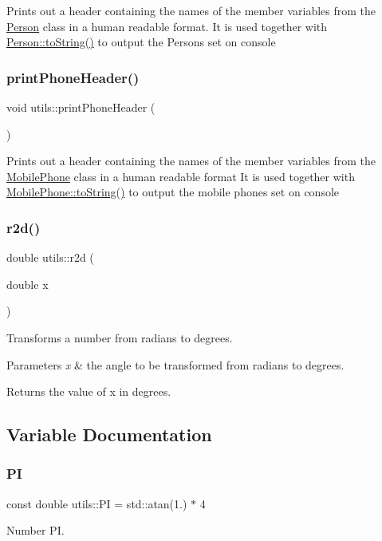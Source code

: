 Prints out a header containing the names of the member variables from the \mbox{\hyperlink{class_person}{Person}} class in a human readable format. It is used together with \mbox{\hyperlink{class_person_a68872538da519d0a04297f43376db27c}{Person\+::to\+String()}} to output the Persons set on console \mbox{\label{namespaceutils_a7633a4dfe509a009f4e02850b03ba1e4}} 
\subsubsection{\texorpdfstring{printPhoneHeader()}{printPhoneHeader()}}
{\footnotesize\ttfamily void utils\+::print\+Phone\+Header (\begin{DoxyParamCaption}{ }\end{DoxyParamCaption})}

Prints out a header containing the names of the member variables from the \mbox{\hyperlink{class_mobile_phone}{Mobile\+Phone}} class in a human readable format It is used together with \mbox{\hyperlink{class_mobile_phone_a2b7e556d12a43e380786ad0eccf3ce04}{Mobile\+Phone\+::to\+String()}} to output the mobile phones set on console \mbox{\label{namespaceutils_af70f6f3c2ac66aa3b4ce64a3b48288cb}} 
\subsubsection{\texorpdfstring{r2d()}{r2d()}}
{\footnotesize\ttfamily double utils\+::r2d (\begin{DoxyParamCaption}\item[{double}]{x }\end{DoxyParamCaption})\hspace{0.3cm}{\ttfamily [inline]}}

Transforms a number from radians to degrees. 
\begin{DoxyParams}{Parameters}
{\em x} & the angle to be transformed from radians to degrees. \\
\hline
\end{DoxyParams}
\begin{DoxyReturn}{Returns}
the value of x in degrees. 
\end{DoxyReturn}


\subsection{Variable Documentation}
\mbox{\label{namespaceutils_a92ce7d254229929886551de7417e1912}} 
\subsubsection{\texorpdfstring{PI}{PI}}
{\footnotesize\ttfamily const double utils\+::\+PI = std\+::atan(1.) $\ast$ 4}

Number PI. 